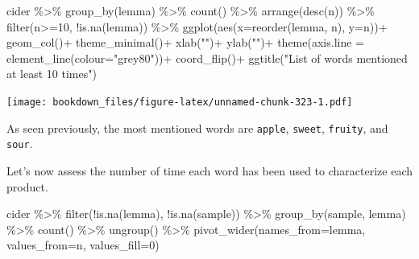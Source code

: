 \documentclass[
]{krantz}
\makeatletter
\newenvironment{Shaded}{\begin{snugshade}}{\end{snugshade}}
\newcommand{\AttributeTok}[1]{\textcolor[rgb]{0.61,0.61,0.61}{#1}}
\newcommand{\DecValTok}[1]{\textcolor[rgb]{0.06,0.06,0.06}{#1}}
\newcommand{\FunctionTok}[1]{\textcolor[rgb]{0,0,0}{#1}}
\newcommand{\NormalTok}[1]{#1}
\newcommand{\SpecialCharTok}[1]{\textcolor[rgb]{0,0,0}{#1}}
\newcommand{\StringTok}[1]{\textcolor[rgb]{0.5,0.5,0.5}{#1}}
\newenvironment{kframe}{%
\medskip{}
\setlength{\fboxsep}{.8em}
 \def\at@end@of@kframe{}%
 \ifinner\ifhmode%
  \def\at@end@of@kframe{\end{minipage}}%
  \begin{minipage}{\columnwidth}%
 \fi\fi%
 \def\FrameCommand##1{\hskip\@totalleftmargin \hskip-\fboxsep
 \colorbox{shadecolor}{##1}\hskip-\fboxsep
     \hskip-\linewidth \hskip-\@totalleftmargin \hskip\columnwidth}%
 \MakeFramed {\advance\hsize-\width
   \@totalleftmargin\z@ \linewidth\hsize
   \@setminipage}}%
 {\par\unskip\endMakeFramed%
 \at@end@of@kframe}
\renewenvironment{Shaded}{\begin{kframe}}{\end{kframe}}
\makeatother
\begin{document}
\begin{Shaded}
\begin{Highlighting}[]
\NormalTok{cider }\SpecialCharTok{\%\textgreater{}\%} 
  \FunctionTok{group\_by}\NormalTok{(lemma) }\SpecialCharTok{\%\textgreater{}\%} 
  \FunctionTok{count}\NormalTok{() }\SpecialCharTok{\%\textgreater{}\%} 
  \FunctionTok{arrange}\NormalTok{(}\FunctionTok{desc}\NormalTok{(n)) }\SpecialCharTok{\%\textgreater{}\%} 
  \FunctionTok{filter}\NormalTok{(n}\SpecialCharTok{\textgreater{}=}\DecValTok{10}\NormalTok{, }\SpecialCharTok{!}\FunctionTok{is.na}\NormalTok{(lemma)) }\SpecialCharTok{\%\textgreater{}\%} 
  \FunctionTok{ggplot}\NormalTok{(}\FunctionTok{aes}\NormalTok{(}\AttributeTok{x=}\FunctionTok{reorder}\NormalTok{(lemma, n), }\AttributeTok{y=}\NormalTok{n))}\SpecialCharTok{+}
  \FunctionTok{geom\_col}\NormalTok{()}\SpecialCharTok{+}
  \FunctionTok{theme\_minimal}\NormalTok{()}\SpecialCharTok{+}
  \FunctionTok{xlab}\NormalTok{(}\StringTok{""}\NormalTok{)}\SpecialCharTok{+}
  \FunctionTok{ylab}\NormalTok{(}\StringTok{""}\NormalTok{)}\SpecialCharTok{+}
  \FunctionTok{theme}\NormalTok{(}\AttributeTok{axis.line =} \FunctionTok{element\_line}\NormalTok{(}\AttributeTok{colour=}\StringTok{"grey80"}\NormalTok{))}\SpecialCharTok{+}
  \FunctionTok{coord\_flip}\NormalTok{()}\SpecialCharTok{+}
  \FunctionTok{ggtitle}\NormalTok{(}\StringTok{"List of words mentioned at least 10 times"}\NormalTok{)}
\end{Highlighting}
\end{Shaded}

\texttt{[image: bookdown\_files/figure-latex/unnamed-chunk-323-1.pdf]}

As seen previously, the most mentioned words are \texttt{apple}, \texttt{sweet}, \texttt{fruity}, and \texttt{sour}.

Let's now assess the number of time each word has been used to characterize each product.

\begin{Shaded}
\begin{Highlighting}[]
\NormalTok{cider }\SpecialCharTok{\%\textgreater{}\%} 
  \FunctionTok{filter}\NormalTok{(}\SpecialCharTok{!}\FunctionTok{is.na}\NormalTok{(lemma), }\SpecialCharTok{!}\FunctionTok{is.na}\NormalTok{(sample)) }\SpecialCharTok{\%\textgreater{}\%} 
  \FunctionTok{group\_by}\NormalTok{(sample, lemma) }\SpecialCharTok{\%\textgreater{}\%} 
  \FunctionTok{count}\NormalTok{() }\SpecialCharTok{\%\textgreater{}\%} 
  \FunctionTok{ungroup}\NormalTok{() }\SpecialCharTok{\%\textgreater{}\%} 
  \FunctionTok{pivot\_wider}\NormalTok{(}\AttributeTok{names\_from=}\NormalTok{lemma, }\AttributeTok{values\_from=}\NormalTok{n, }\AttributeTok{values\_fill=}\DecValTok{0}\NormalTok{)}
\end{Highlighting}
\end{Shaded}
\end{document}

